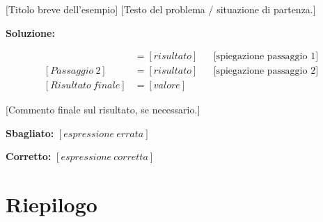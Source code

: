 \spazio

\begin{esempio}{[Titolo breve dell'esempio]}
    [Testo del problema / situazione di partenza.]

    \medskip
    \textbf{Soluzione:}

    \begin{align*}
        [Passaggio\ 1] &= [risultato] && \text{[spiegazione passaggio 1]} \\
        [Passaggio\ 2] &= [risultato] && \text{[spiegazione passaggio 2]} \\
        [Risultato\ finale] &= [valore]
    \end{align*}

    [Commento finale sul risultato, se necessario.]
\end{esempio}

\spazio

\begin{attenzione}

    \medskip
    {\color{red}\textbf{Sbagliato:}} $[espressione\ errata]$

    \medskip
    {\color{colorePrimario}\textbf{Corretto:}} $[espressione\ corretta]$
\end{attenzione}

\spazio

\begin{sapevi}
\end{sapevi}

\spazio


\section*{Riepilogo}

